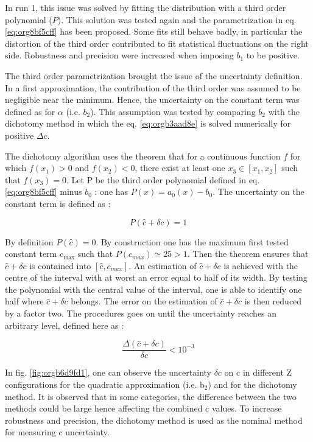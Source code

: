 In run 1, this issue was solved by fitting the distribution with a third order polynomial ($P$).
This solution was tested again and the para\-metri\-zation in eq. \ref{eq:org8bf5cff} has been proposed.
Some fits still behave badly, in particular the distortion of the third order contributed to fit statistical fluctuations  on the right side.
Robustness and precision were increased when imposing $b_1$ to be positive.

The third order parametrization brought the issue of the uncertainty definition.
In a first approximation, the contribution of the third order was assumed to be negligible near the minimum.
Hence, the uncertainty on the constant term was defined as for $\alpha$ (i.e. $b_2$).
This assumption was tested by comparing $b_2$ with the dichotomy method in which the eq. \ref{eq:orgb3aad8e} is solved numerically for positive $\Delta c$.


The dichotomy algorithm uses the theorem that for a continuous function $f$ for which $f(x_1)>0$ and $f(x_2)<0$, there exist at least one $x_3\in[x_1,x_2]$ such that $f(x_3)=0$.
Let P be the third order polynomial defined in eq. \ref{eq:org8bf5cff} minus $b_0$ : one has $P(x)=a_0(x)-b_0$.
The uncertainty on the constant term is defined as :

\begin{equation}
P( \hat{c} + \delta c) = 1
\end{equation}

By definition \(P(\hat{c})=0\).
By construction one has the maximum first tested constant term c\(_{\text{max}}\) such that \(P(c_{max})\simeq 25 > 1\).
Then the theorem ensures that \(\hat{c}+\delta c\) is contained into \([\hat{c}, c_{max}]\).
An estimation of \(\hat{c}+\delta c\) is achieved with the centre of the interval with at worst an error equal to half of its width.
By testing the polynomial with the central value of the interval, one is able to identify one half where \(\hat{c}+\delta c\) belongs.
The error on the estimation of \(\hat{c}+\delta c\) is then reduced by a factor two.
The procedures goes on until the uncertainty reaches an arbitrary level, defined here as :

\begin{equation}
\frac{\Delta (\hat{c}+\delta c)}{\delta c} < 10^{-3}
\end{equation}

In fig. \ref{fig:orgb6d9fd1}, one can observe the uncertainty \(\delta c\) on c in different Z configurations for the quadratic approximation (i.e. b\(_{\text{2}}\)) and for the dichotomy method.
It is observed that in some categories, the difference between the two methods could be large hence affecting the combined c values.
To increase robustness and precision, the dichotomy method is used as the nominal method for measuring c uncertainty.

